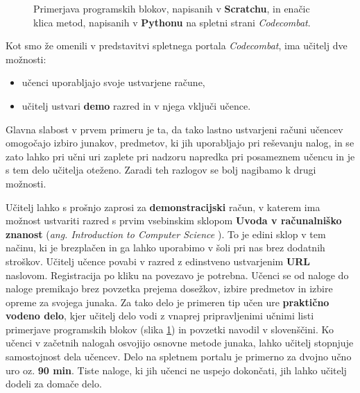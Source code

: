 \begin{figure}[h!]
    \caption{Primerjava programskih blokov, napisanih v
      \textbf{Scratchu}, in enačic klica metod, napisanih v
      \textbf{Pythonu} na spletni strani \emph{Codecombat}.}
   \label{fig:primerjava:scrVScc}
\end{figure}

Kot smo že omenili v predstavitvi spletnega portala \emph{Codecombat},
ima učitelj dve možnosti:

\begin{itemize}
\tightlist
\item učenci uporabljajo svoje ustvarjene račune,
\item učitelj ustvari \textbf{demo} razred in v njega vključi učence.
\end{itemize}

Glavna slabost v prvem primeru je ta, da tako lastno ustvarjeni računi
učencev omogočajo izbiro junakov, predmetov, ki jih uporabljajo pri
reševanju nalog, in se zato lahko pri učni uri zaplete pri nadzoru
napredka pri posameznem učencu in je s tem delo učitelja oteženo. Zaradi
teh razlogov se bolj nagibamo k drugi možnosti.

Učitelj lahko s prošnjo zaprosi za \textbf{demonstracijski} račun, v
katerem ima možnost ustvariti razred s prvim vsebinskim sklopom
\textbf{Uvoda v računalniško znanost} (\emph{ang. Introduction to
  Computer Science }). To je edini sklop v tem načinu, ki je
brezplačen in ga lahko uporabimo v šoli pri nas brez dodatnih
stroškov. Učitelj učence povabi v razred z edinstveno ustvarjenim
\textbf{URL} naslovom. Registracija po kliku na povezavo je potrebna.
Učenci se od naloge do naloge premikajo brez povzetka prejema dosežkov, izbire predmetov in izbire opreme za svojega junaka. Za tako delo
je primeren tip učen ure \textbf{praktično vodeno delo}, kjer učitelj
delo vodi z vnaprej pripravljenimi učnimi listi primerjave programskih
blokov (slika \ref{fig:primerjava:scrVScc}) in povzetki navodil v
slovenščini. Ko učenci v začetnih nalogah osvojijo osnovne metode
junaka, lahko učitelj stopnjuje samostojnost dela učencev. Delo na
spletnem portalu je primerno za dvojno učno uro
oz. \textbf{90 min}. Tiste naloge, ki jih učenci ne uspejo dokončati,
jih lahko učitelj dodeli za domače delo.

